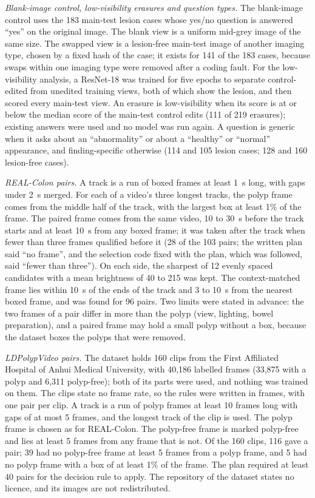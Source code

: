 \emph{Blank-image control, low-visibility erasures and question types.} The blank-image control uses the 183 main-test lesion cases whose yes/no question is answered ``yes'' on the original image. The blank view is a uniform mid-grey image of the same size. The swapped view is a lesion-free main-test image of another imaging type, chosen by a fixed hash of the case; it exists for 141 of the 183 cases, because swaps within one imaging type were removed after a coding fault. For the low-visibility analysis, a ResNet-18 was trained for five epochs to separate control-edited from unedited training views, both of which show the lesion, and then scored every main-test view. An erasure is low-visibility when its score is at or below the median score of the main-test control edits (111 of 219 erasures); existing answers were used and no model was run again. A question is generic when it asks about an ``abnormality'' or about a ``healthy'' or ``normal'' appearance, and finding-specific otherwise (114 and 105 lesion cases; 128 and 160 lesion-free cases).

\emph{REAL-Colon pairs.} A track is a run of boxed frames at least 1~s long, with gaps under 2~s merged. For each of a video's three longest tracks, the polyp frame comes from the middle half of the track, with the largest box at least 1\% of the frame. The paired frame comes from the same video, 10 to 30~s before the track starts and at least 10~s from any boxed frame; it was taken after the track when fewer than three frames qualified before it (28 of the 103 pairs; the written plan said ``no frame'', and the selection code fixed with the plan, which was followed, said ``fewer than three''). On each side, the sharpest of 12 evenly spaced candidates with a mean brightness of 40 to 215 was kept. The context-matched frame lies within 10~s of the ends of the track and 3 to 10~s from the nearest boxed frame, and was found for 96 pairs. Two limits were stated in advance: the two frames of a pair differ in more than the polyp (view, lighting, bowel preparation), and a paired frame may hold a small polyp without a box, because the dataset boxes the polyps that were removed.

\emph{LDPolypVideo pairs.} The dataset holds 160 clips from the First Affiliated Hospital of Anhui Medical University, with 40,186 labelled frames (33,875 with a polyp and 6,311 polyp-free); both of its parts were used, and nothing was trained on them. The clips state no frame rate, so the rules were written in frames, with one pair per clip. A track is a run of polyp frames at least 10 frames long with gaps of at most 5 frames, and the longest track of the clip is used. The polyp frame is chosen as for REAL-Colon. The polyp-free frame is marked polyp-free and lies at least 5 frames from any frame that is not. Of the 160 clips, 116 gave a pair; 39 had no polyp-free frame at least 5 frames from a polyp frame, and 5 had no polyp frame with a box of at least 1\% of the frame. The plan required at least 40 pairs for the decision rule to apply. The repository of the dataset states no licence, and its images are not redistributed.

